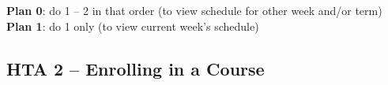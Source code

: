 \documentclass[12pt]{article}
\begin{document}
\textbf{Plan 0}: do 1 -- 2 in that order (to view schedule for other week and/or term)\\

\textbf{Plan 1}: do 1 only (to view current week's schedule)

\subsection{HTA 2 -- Enrolling in a Course}
\vspace{4mm}
\begin{center}
\end{center}
\end{document}
